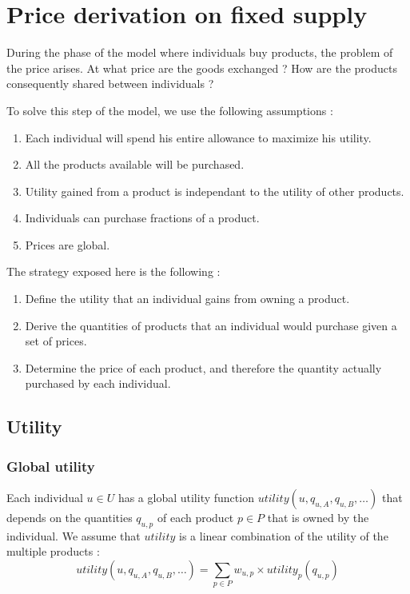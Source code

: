 \section{Price derivation on fixed supply}

During the phase of the model where individuals buy products, the problem of the price arises.
At what price are the goods exchanged ?
How are the products consequently shared between individuals ?

To solve this step of the model, we use the following assumptions :
\begin{enumerate}
    \item Each individual will spend his entire allowance to maximize his utility.
    \item All the products available will be purchased.
    \item Utility gained from a product is independant to the utility of other products.
    \item Individuals can purchase fractions of a product.
    \item Prices are global.
\end{enumerate}

The strategy exposed here is the following :
\begin{enumerate}
    \item Define the utility that an individual gains from owning a product.
    \item Derive the quantities of products that an individual would purchase given a set of prices.
    \item Determine the price of each product, and therefore the quantity actually purchased by each individual.
\end{enumerate}

\subsection{Utility}

\subsubsection{Global utility}
Each individual $u\in U$ has a global utility function $utility(u, q_{u, A}, q_{u, B}, \dots)$ that depends on the quantities $q_{u, p}$ of each product $p\in P$ that is owned by the individual.
We assume that $utility$ is a linear combination of the utility of the multiple products :
\begin{equation}
    \label{eq:global_utility}
    utility(u, q_{u, A}, q_{u, B}, \dots) = \sum_{p\in P} w_{u, p}\times utility_p(q_{u, p})
\end{equation}

